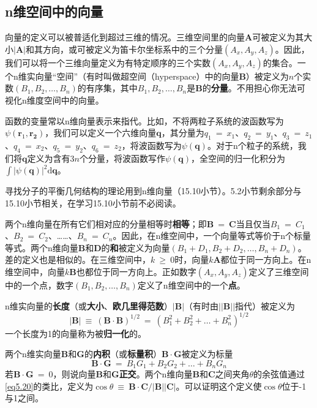 \documentclass[12pt,a4paper,openany]{ctexbook}
\newcommand{\abs}[1]{\left| #1 \right|}
\newcommand{\dd}[1]{\mathrm{d} #1}
\begin{document}
\subsection{n维空间中的向量}
\begin{flushleft}
    \setlength{\parindent}{2em}
向量的定义可以被普适化到超过三维的情况。三维空间里的向量$\boldsymbol{A}$可被定义为其大小$\abs{\boldsymbol{A}}$和其方向，或可被定义为笛卡尔坐标系中的三个分量$(A_x,A_y,A_z)$。因此，我们可以将一个三维向量定义为有特定顺序的三个实数$(A_x,A_y,A_z)$的集合。一个n维实向量“空间”（有时叫做超空间（hyperspace）中的向量$\boldsymbol{B}$）被定义为$n$个实数$(B_1,B_2,\dots,B_n)$的有序集，其中$B_1,B_2,\dots,B_n$是$\boldsymbol{B}$的\textbf{分量}。不用担心你无法可视化n维度空间中的向量。

函数的变量常以n维向量表示来指代。比如，不将两粒子系统的波函数写为$\psi(\boldsymbol{r}_1,\boldsymbol{r_2})$，我们可以定义一个六维向量$\boldsymbol{q}$，其分量为$q_1\ =\ x_1$、$q_2\ =\ y_1$、$q_3\ =\ z_1$、$q_4\ =\ x_2$、$q_5\ =\ y_2$、$q_6\ =\ z_2$，将波函数写为$\psi(\boldsymbol{q})$。对于n个粒子的系统，我们将$\boldsymbol{q}$定义为含有$3n$个分量，将波函数写作$\psi(\boldsymbol{q})$，全空间的归一化积分为$\int\abs{\psi(\boldsymbol{q})}^2\dd\boldsymbol{q}$。

寻找分子的平衡几何结构的理论用到n维向量（15.10小节）。5.2小节剩余部分与15.10小节相关，在学习15.10小节前不必阅读。

两个n维向量在所有它们相对应的分量相等时\textbf{相等}；即$\boldsymbol{B}\ =\ \boldsymbol{C}$当且仅当$B_1\ =\ C_1$、$B_2\ =\ C_2$、……、$B_n\ =\ C_n$。因此，在n维空间中，一个向量等式等价于n个标量等式。两个n维向量$\boldsymbol{B}$和$\boldsymbol{D}$的\textbf{和}被定义为向量$(B_1+D_1,B_2+D_2,\dots,B_n+D_n)$。差的定义也是相似的。在三维空间中，$k\ \geq\ 0$时，向量$k\boldsymbol{A}$都位于同一方向上。在n维空间中，向量$k\boldsymbol{B}$也都位于同一方向上。正如数字$(A_x,A_y,A_z)$定义了三维空间中的一个点，数字$(B_1,B_2,\dots,B_n)$定义了n维空间中的一个\textbf{点}。

n维实向量的\textbf{长度}（或\textbf{大小}、\textbf{欧几里得范数}）$\abs{\boldsymbol{B}}$（有时由$\abs{\abs{\boldsymbol{B}}}$指代）被定义为
\begin{equation*}
    \abs{\boldsymbol{B}}\ \equiv\ (\boldsymbol{B}\cdot\boldsymbol{B})^{1/2}\ =\ (B_1^2+B_2^2+\dots+B_n^2)^{1/2}
\end{equation*}
一个长度为1的向量称为被\textbf{归一化}的。

两个n维实向量$\boldsymbol{B}$和$\boldsymbol{G}$的\textbf{内积}（或\textbf{标量积}）$\boldsymbol{B}\cdot\boldsymbol{G}$被定义为标量
\begin{equation*}
    \boldsymbol{B}\cdot\boldsymbol{G}\ =\ B_1G_1+B_2G_2+\dots+B_nG_n
\end{equation*}
若$\boldsymbol{B}\cdot\boldsymbol{G}\ =\ 0$，则说向量$\boldsymbol{B}$和$\boldsymbol{G}$\textbf{正交}。两个n维向量$\boldsymbol{B}$和$\boldsymbol{C}$之间夹角$\theta$的余弦值通过\eqref{eq5.20}的类比，定义为$\cos\theta\ \equiv\ \boldsymbol{B}\cdot\boldsymbol{C}/\abs{\boldsymbol{B}}\abs{\boldsymbol{C}}$。可以证明这个定义使$\cos\theta$位于-1与1之间。


\end{flushleft}
\end{document}
